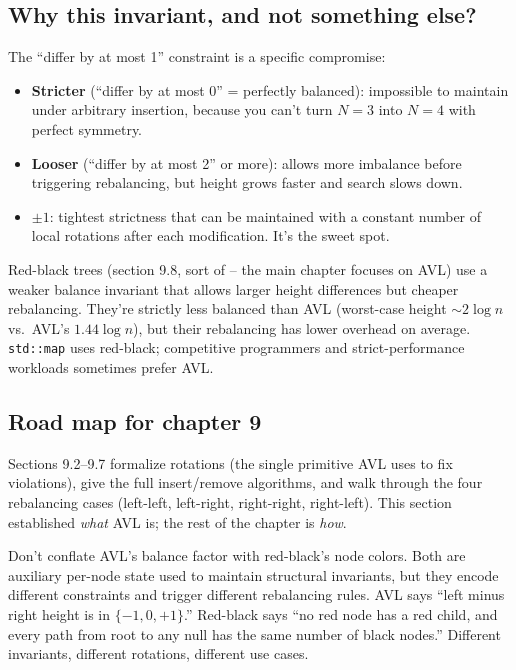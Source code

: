 \documentclass[11pt]{article}
\begin{document}
\subsection*{Why this invariant, and not something else?}

The ``differ by at most 1'' constraint is a specific compromise:
\begin{itemize}[leftmargin=*]
    \item \textbf{Stricter} (``differ by at most 0'' = perfectly balanced): impossible to maintain under arbitrary insertion, because you can't turn $N = 3$ into $N = 4$ with perfect symmetry.
    \item \textbf{Looser} (``differ by at most 2'' or more): allows more imbalance before triggering rebalancing, but height grows faster and search slows down.
    \item \textbf{$\pm 1$}: tightest strictness that can be maintained with a constant number of local rotations after each modification. It's the sweet spot.
\end{itemize}

Red-black trees (section 9.8, sort of -- the main chapter focuses on AVL) use a weaker balance invariant that allows larger height differences but cheaper rebalancing. They're strictly less balanced than AVL (worst-case height $\sim 2 \log n$ vs.\ AVL's $1.44 \log n$), but their rebalancing has lower overhead on average. \texttt{std::map} uses red-black; competitive programmers and strict-performance workloads sometimes prefer AVL.

\subsection*{Road map for chapter 9}

Sections 9.2--9.7 formalize rotations (the single primitive AVL uses to fix violations), give the full insert/remove algorithms, and walk through the four rebalancing cases (left-left, left-right, right-right, right-left). This section established \emph{what} AVL is; the rest of the chapter is \emph{how}.

\begin{warnbox}
Don't conflate AVL's balance factor with red-black's node colors. Both are auxiliary per-node state used to maintain structural invariants, but they encode different constraints and trigger different rebalancing rules. AVL says ``left minus right height is in $\{-1, 0, +1\}$.'' Red-black says ``no red node has a red child, and every path from root to any null has the same number of black nodes.'' Different invariants, different rotations, different use cases.
\end{warnbox}
\end{document}
